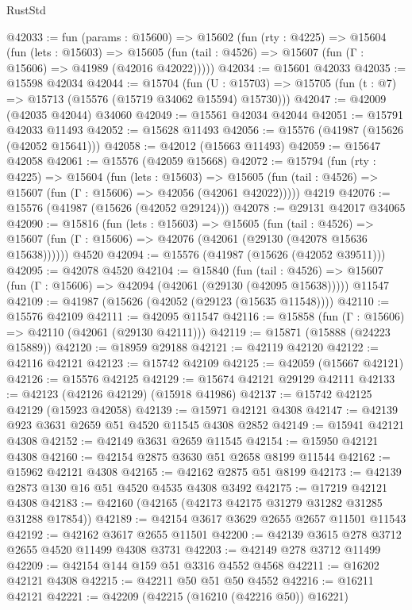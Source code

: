 \begin{lexlean}{RustStd}
\begin{coremodule}
@42033 := fun (params : @15600) =>
  @15602
    (fun (rty : @4225) =>
    @15604
      (fun (lets : @15603) =>
      @15605 (fun (tail : @4526) => @15607 (fun (Γ : @15606) => @41989 (@42016 @42022)))))
@42034 := @15601 @42033
@42035 := @15598 @42034
@42044 := @15704
    (fun (U : @15703) => @15705 (fun (t : @7) => @15713 (@15576 (@15719 @34062 @15594) @15730)))
@42047 := @42009 (@42035 @42044) @34060
@42049 := @15561 @42034 @42044
@42051 := @15791 @42033 @11493
@42052 := @15628 @11493
@42056 := @15576 (@41987 (@15626 (@42052 @15641)))
@42058 := @42012 (@15663 @11493)
@42059 := @15647 @42058
@42061 := @15576 (@42059 @15668)
@42072 := @15794
    (fun (rty : @4225) =>
    @15604
      (fun (lets : @15603) =>
      @15605 (fun (tail : @4526) => @15607 (fun (Γ : @15606) => @42056 (@42061 @42022)))))
    @4219
@42076 := @15576 (@41987 (@15626 (@42052 @29124)))
@42078 := @29131 @42017 @34065
@42090 := @15816
    (fun (lets : @15603) =>
    @15605
      (fun (tail : @4526) =>
      @15607 (fun (Γ : @15606) => @42076 (@42061 (@29130 (@42078 @15636 @15638))))))
    @4520
@42094 := @15576 (@41987 (@15626 (@42052 @39511)))
@42095 := @42078 @4520
@42104 := @15840
    (fun (tail : @4526) => @15607 (fun (Γ : @15606) => @42094 (@42061 (@29130 (@42095 @15638)))))
    @11547
@42109 := @41987 (@15626 (@42052 (@29123 (@15635 @11548))))
@42110 := @15576 @42109
@42111 := @42095 @11547
@42116 := @15858 (fun (Γ : @15606) => @42110 (@42061 (@29130 @42111)))
@42119 := @15871 (@15888 (@24223 @15889))
@42120 := @18959 @29188
@42121 := @42119 @42120
@42122 := @42116 @42121
@42123 := @15742 @42109
@42125 := @42059 (@15667 @42121)
@42126 := @15576 @42125
@42129 := @15674 @42121 @29129 @42111
@42133 := @42123 (@42126 @42129) (@15918 @41986)
@42137 := @15742 @42125 @42129 (@15923 @42058)
@42139 := @15971 @42121 @4308
@42147 := @42139 @923 @3631 @2659 @51 @4520 @11545 @4308 @2852
@42149 := @15941 @42121 @4308
@42152 := @42149 @3631 @2659 @11545
@42154 := @15950 @42121 @4308
@42160 := @42154 @2875 @3630 @51 @2658 @8199 @11544
@42162 := @15962 @42121 @4308
@42165 := @42162 @2875 @51 @8199
@42173 := @42139 @2873 @130 @16 @51 @4520 @4535 @4308 @3492
@42175 := @17219 @42121 @4308
@42183 := @42160 (@42165 (@42173 @42175 @31279 @31282 @31285 @31288 @17854))
@42189 := @42154 @3617 @3629 @2655 @2657 @11501 @11543
@42192 := @42162 @3617 @2655 @11501
@42200 := @42139 @3615 @278 @3712 @2655 @4520 @11499 @4308 @3731
@42203 := @42149 @278 @3712 @11499
@42209 := @42154 @144 @159 @51 @3316 @4552 @4568
@42211 := @16202 @42121 @4308
@42215 := @42211 @50 @51 @50 @4552
@42216 := @16211 @42121
@42221 := @42209 (@42215 (@16210 (@42216 @50)) @16221)

\end{coremodule}
\end{lexlean}
